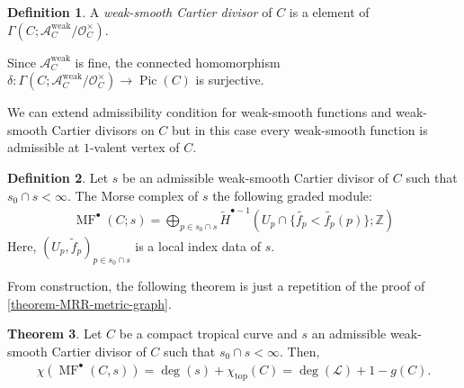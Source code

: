 \documentclass[a4paper,dvipdfmx,reqno,12pt]{amsart}
\theoremstyle{definition}
\newtheorem{theorem}{Theorem}[section]
\newtheorem{definition}[theorem]{Definition}
\newcommand{\opn}[1]{\operatorname{#1}}
\numberwithin{equation}{section}
\begin{document}
\begin{definition}
A \emph{weak-smooth Cartier divisor} of $C$ is a 
element of $\Gamma(C;\mathcal{A}_C^{\opn{weak}}/
\mathcal{O}^{\times}_C)$.
\end{definition}

Since $\mathcal{A}_C^{\opn{weak}}$ is fine, 
the connected homomorphism 
$\delta\colon \Gamma(C;\mathcal{A}_C^{\opn{weak}}/
\mathcal{O}^{\times}_C)\to \opn{Pic}(C)$ is 
surjective.


We can extend admissibility condition for
weak-smooth functions and weak-smooth Cartier 
divisors on $C$ but in this case every 
weak-smooth function is admissible at $1$-valent
vertex of $C$.

\begin{definition}
Let $s$ be an admissible weak-smooth Cartier divisor 
of $C$ such that $s_0\cap s<\infty$.
The Morse complex of $s$ the following graded module:
\begin{align}
  \opn{MF}^{\bullet}(C;s)=\bigoplus_{p\in s_0\cap s} 
\tilde{H}^{\bullet-1}
(U_p\cap \{\tilde{f_p}<\tilde{f_p}(p)\};\mathbb{Z})
\end{align}
Here, $(U_p,\tilde{f}_p)_{p\in s_0\cap s}$ is a local 
index data of $s$.
\end{definition}

From construction, the following theorem is just a
repetition of the proof of 
\cref{theorem-MRR-metric-graph}.

\begin{theorem} \label{theorem-MRR-tropical-curve}
Let $C$ be a compact tropical curve and 
$s$ an admissible weak-smooth Cartier divisor 
of $C$ such that $s_0\cap s<\infty$. Then,
\begin{align}
  \chi(\opn{MF}^{\bullet}(C,s))=\opn{deg}(s)+
\chi_{\opn{top}}(C)=\opn{deg}(\mathcal{L})+1-g(C).
\end{align}
\end{theorem}
\end{document}
